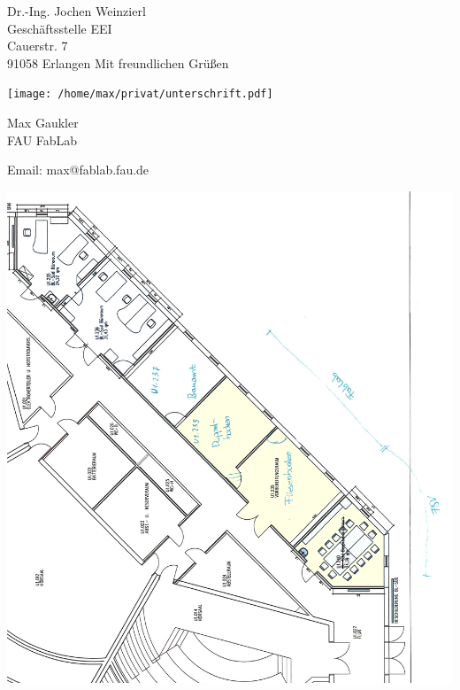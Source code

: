 \documentclass[a4paper,german]{letter}
\begin{document}
\begin{letter}{Dr.-Ing. Jochen Weinzierl\\ Geschäftsstelle EEI\\ Cauerstr. 7\\ 91058 Erlangen}
\vspace{1em}
Mit freundlichen Grüßen

\texttt{[image: /home/max/privat/unterschrift.pdf]}

Max Gaukler\\
FAU FabLab

Email: max@fablab.fau.de

\vspace{1em}

\end{letter}
\newpage
\thispagestyle{empty}
\hspace{-1.5cm}\includegraphics[width=18cm]{./mhb-raumplan-ausschnitt.png}

\end{document}
